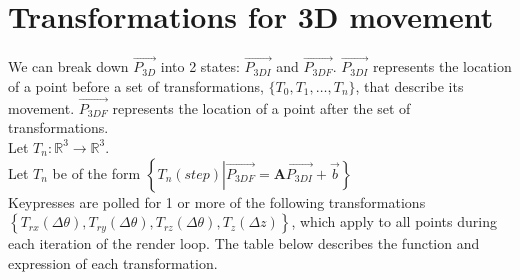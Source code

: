 \documentclass[11pt]{article}
\begin{document}
\setcounter{section}{2}
\section{Transformations for 3D movement}

We can break down $\vec{P_{3D}}$ into 2 states: $\vec{P_{3DI}}$ and $\vec{P_{3DF}}$.
$\vec{P_{3DI}}$ represents the location of a point before a set of transformations,
$\{ T_{0}, T_{1}, \ldots, T_{n} \}$, that describe its movement. $\vec{P_{3DF}}$ 
represents the location of a point after the set of transformations.\\

Let $T_{n}:\mathbb{R}^3 \rightarrow \mathbb{R}^3$.\\
Let $T_{n}$ be of the form 
$\left\{ T_{n}(step) \left| \vec{P_{3DF}} = 
 \mathbf{A}\vec{P_{3DI}} + \vec{b}\right. \right\}$ \\

Keypresses are polled for 1 or more of the following transformations\\
$\left\{ T_{rx}(\Delta\theta), T_{ry}(\Delta\theta), T_{rz}(\Delta\theta),
T_z(\Delta z) \right\}$, which apply to all points during each iteration of the
render loop. The table below describes 
the function and expression of each transformation.\\
\\
\end{document}
